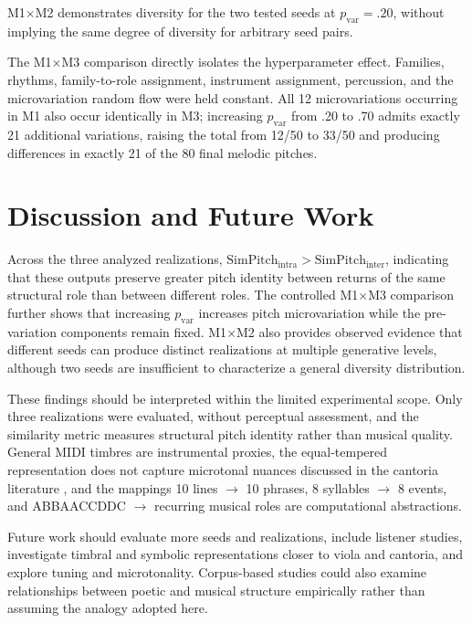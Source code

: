 \documentclass{article}
\begin{document}
M1$\times$M2 demonstrates diversity for the two tested seeds at \(p_{\mathrm{var}}=.20\), without implying the same degree of diversity for arbitrary seed pairs.

The M1$\times$M3 comparison directly isolates the hyperparameter effect. Families, rhythms, family-to-role assignment, instrument assignment, percussion, and the microvariation random flow were held constant. All 12 microvariations occurring in M1 also occur identically in M3; increasing \(p_{\mathrm{var}}\) from .20 to .70 admits exactly 21 additional variations, raising the total from 12/50 to 33/50 and producing differences in exactly 21 of the 80 final melodic pitches.

\section{Discussion and Future Work}\label{sec:discussion}

Across the three analyzed realizations, \(\mathrm{SimPitch}_{\mathrm{intra}}>\mathrm{SimPitch}_{\mathrm{inter}}\), indicating that these outputs preserve greater pitch identity between returns of the same structural role than between different roles. The controlled M1$\times$M3 comparison further shows that increasing \(p_{\mathrm{var}}\) increases pitch microvariation while the pre-variation components remain fixed. M1$\times$M2 also provides observed evidence that different seeds can produce distinct realizations at multiple generative levels, although two seeds are insufficient to characterize a general diversity distribution.

These findings should be interpreted within the limited experimental scope. Only three realizations were evaluated, without perceptual assessment, and the similarity metric measures structural pitch identity rather than musical quality. General MIDI timbres are instrumental proxies, the equal-tempered representation does not capture microtonal nuances discussed in the cantoria literature \cite{freire2019tratamento}, and the mappings 10 lines \(\rightarrow\) 10 phrases, 8 syllables \(\rightarrow\) 8 events, and ABBAACCDDC \(\rightarrow\) recurring musical roles are computational abstractions.

Future work should evaluate more seeds and realizations, include listener studies, investigate timbral and symbolic representations closer to viola and cantoria, and explore tuning and microtonality. Corpus-based studies could also examine relationships between poetic and musical structure empirically rather than assuming the analogy adopted here.


\end{document}

